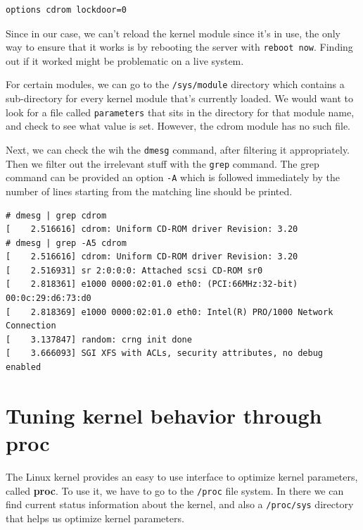 \vspace{-15pt}
\begin{verbatim}
options cdrom lockdoor=0
\end{verbatim}
\vspace{-10pt}

\noindent
Since in our case, we can't reload the kernel module since it's in use, the only way to ensure that it works is by rebooting the server with \verb|reboot now|. Finding out if it worked might be problematic on a live system. 

For certain modules, we can go to the \verb|/sys/module| directory which contains a sub-directory for every kernel module that's currently loaded. We would want to look for a file called \verb|parameters| that sits in the directory for that module name, and check to see what value is set. However, the cdrom module has no such file. 

Next, we can check the wih the \verb|dmesg| command, after filtering it appropriately. Then we filter out the irrelevant stuff with the \verb|grep| command. The grep command can be provided an option \verb|-A| which is followed immediately by the number of lines starting from the matching line should be printed. 

\vspace{-15pt}
\begin{verbatim}
# dmesg | grep cdrom
[    2.516616] cdrom: Uniform CD-ROM driver Revision: 3.20
# dmesg | grep -A5 cdrom
[    2.516616] cdrom: Uniform CD-ROM driver Revision: 3.20
[    2.516931] sr 2:0:0:0: Attached scsi CD-ROM sr0
[    2.818361] e1000 0000:02:01.0 eth0: (PCI:66MHz:32-bit) 00:0c:29:d6:73:d0
[    2.818369] e1000 0000:02:01.0 eth0: Intel(R) PRO/1000 Network Connection
[    3.137847] random: crng init done
[    3.666093] SGI XFS with ACLs, security attributes, no debug enabled
\end{verbatim}
\vspace{-10pt}

\section{Tuning kernel behavior through proc}
The Linux kernel provides an easy to use interface to optimize kernel parameters, called \textbf{proc}. To use it, we have to go to the \verb|/proc| file system. In there we can find current status information about the kernel, and also a \verb|/proc/sys| directory that helps us optimize kernel parameters. 

